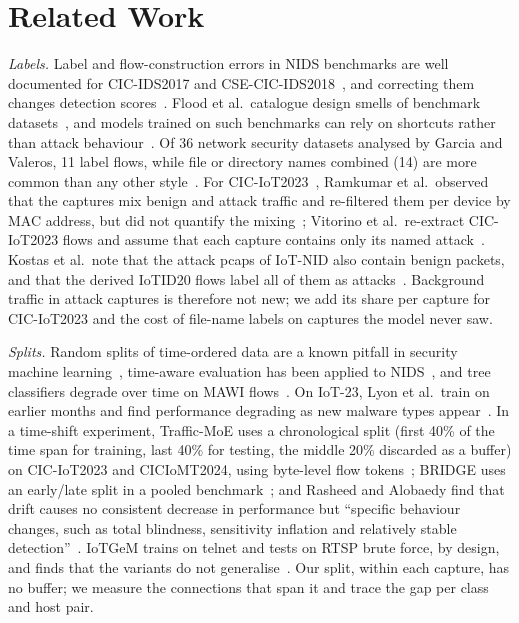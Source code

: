 \section{Related Work}\label{sec:related}

\emph{Labels.} Label and flow-construction errors in NIDS benchmarks are well documented for CIC-IDS2017 and CSE-CIC-IDS2018~\cite{engelen2021troubleshooting,liu2022error}, and correcting them changes detection scores~\cite{lanvin2023errors}. Flood et al.\ catalogue design smells of benchmark datasets~\cite{flood2024smells}, and models trained on such benchmarks can rely on shortcuts rather than attack behaviour~\cite{jacobs2022emperor}. Of 36 network security datasets analysed by Garcia and Valeros, 11 label flows, while file or directory names combined (14) are more common than any other style~\cite{garcia2023labeling}. For CIC-IoT2023~\cite{neto2023ciciot2023}, Ramkumar et al.\ observed that the captures mix benign and attack traffic and re-filtered them per device by MAC address, but did not quantify the mixing~\cite{ramkumar2024diagnosing}; Vitorino et al.\ re-extract CIC-IoT2023 flows and assume that each capture contains only its named attack~\cite{vitorino2025revisiting}. Kostas et al.\ note that the attack pcaps of IoT-NID also contain benign packets, and that the derived IoTID20 flows label all of them as attacks~\cite[App.~A.3]{kostas2024iotgem}. Background traffic in attack captures is therefore not new; we add its share per capture for CIC-IoT2023 and the cost of file-name labels on captures the model never saw.

\emph{Splits.} Random splits of time-ordered data are a known pitfall in security machine learning~\cite{arp2022dos,pendlebury2019tesseract,apruzzese2023sok}, time-aware evaluation has been applied to NIDS~\cite{andresini2021insomnia}, and tree classifiers degrade over time on MAWI flows~\cite{schraven2026mawiflow}. On IoT-23, Lyon et al.\ train on earlier months and find performance degrading as new malware types appear~\cite{lyon2026iot23drift}. In a time-shift experiment, Traffic-MoE uses a chronological split (first 40\% of the time span for training, last 40\% for testing, the middle 20\% discarded as a buffer) on CIC-IoT2023 and CICIoMT2024, using byte-level flow tokens~\cite{zhou2026trafficmoe}; BRIDGE uses an early/late split in a pooled benchmark~\cite{bridge2026tchnet}; and Rasheed and Alobaedy find that drift causes no consistent decrease in performance but ``specific behaviour changes, such as total blindness, sensitivity inflation and relatively stable detection''~\cite{rasheed2026drift}. IoTGeM trains on telnet and tests on RTSP brute force, by design, and finds that the variants do not generalise~\cite{kostas2024iotgem}. Our split, within each capture, has no buffer; we measure the connections that span it and trace the gap per class and host pair.

